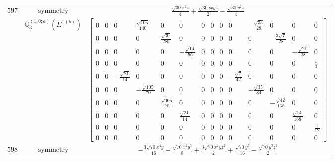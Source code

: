 \documentclass[fleqn,8pt,landscape]{jsarticle}
\begin{document}
\begin{longtable}{ccc}
$ 597 $ & $ \text{symmetry} $ & $ \frac{\sqrt{30} x^{2} z}{4} + \frac{\sqrt{30} i x y z}{2} - \frac{\sqrt{30} y^{2} z}{4} $ \\
$  $ & $ \mathbb{Q}_{3}^{(1,0;a)}(E^{\prime\prime(b)}) $ & $ \begin{bmatrix} 0 & 0 & 0 & \frac{\sqrt{105}}{140} & 0 & 0 & 0 & 0 & 0 & 0 & - \frac{\sqrt{35}}{28} & 0 & 0 & 0 \\ 0 & 0 & 0 & 0 & \frac{\sqrt{70}}{280} & 0 & 0 & 0 & 0 & 0 & 0 & - \frac{3 \sqrt{7}}{28} & 0 & 0 \\ 0 & 0 & 0 & 0 & 0 & - \frac{\sqrt{14}}{56} & 0 & 0 & 0 & 0 & 0 & 0 & - \frac{\sqrt{21}}{28} & 0 \\ 0 & 0 & 0 & 0 & 0 & 0 & 0 & 0 & 0 & 0 & 0 & 0 & 0 & \frac{1}{4} \\ 0 & 0 & - \frac{\sqrt{21}}{14} & 0 & 0 & 0 & 0 & 0 & 0 & - \frac{\sqrt{7}}{42} & 0 & 0 & 0 & 0 \\ 0 & 0 & 0 & - \frac{\sqrt{105}}{70} & 0 & 0 & 0 & 0 & 0 & 0 & - \frac{\sqrt{35}}{84} & 0 & 0 & 0 \\ 0 & 0 & 0 & 0 & \frac{\sqrt{105}}{70} & 0 & 0 & 0 & 0 & 0 & 0 & - \frac{\sqrt{42}}{168} & 0 & 0 \\ 0 & 0 & 0 & 0 & 0 & \frac{\sqrt{21}}{14} & 0 & 0 & 0 & 0 & 0 & 0 & \frac{\sqrt{14}}{168} & 0 \\ 0 & 0 & 0 & 0 & 0 & 0 & 0 & 0 & 0 & 0 & 0 & 0 & 0 & \frac{1}{12} \\ 0 & 0 & 0 & 0 & 0 & 0 & 0 & 0 & 0 & 0 & 0 & 0 & 0 & 0 \end{bmatrix} $ \\ \hline
$ 598 $ & $ \text{symmetry} $ & $ - \frac{3 \sqrt{70} x^{4} y}{16} - \frac{\sqrt{70} x^{2} y^{3}}{8} + \frac{3 \sqrt{70} x^{2} y z^{2}}{2} + \frac{\sqrt{70} y^{5}}{16} - \frac{\sqrt{70} y^{3} z^{2}}{2} $ \\

\end{longtable}
\end{document}
